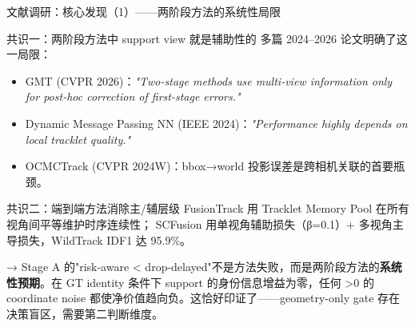 \documentclass[aspectratio=169,xcolor=dvipsnames]{beamer}
\begin{document}
\begin{frame}{文献调研：核心发现（1）——两阶段方法的系统性局限}
\scriptsize
\begin{block}{共识一：两阶段方法中 support view 就是辅助性的}
多篇 2024--2026 论文明确了这一局限：
\begin{itemize}\setlength\itemsep{0pt}
  \item GMT (CVPR 2026)：\textit{"Two-stage methods use multi-view information only for post-hoc correction of first-stage errors."}
  \item Dynamic Message Passing NN (IEEE 2024)：\textit{"Performance highly depends on local tracklet quality."}
  \item OCMCTrack (CVPR 2024W)：bbox→world 投影误差是跨相机关联的首要瓶颈。
\end{itemize}
\end{block}

\begin{block}{共识二：端到端方法消除主/辅层级}
FusionTrack 用 Tracklet Memory Pool 在所有视角间平等维护时序连续性；
SCFusion 用单视角辅助损失（β=0.1）+ 多视角主导损失，WildTrack IDF1 达 95.9\%。
\end{block}

\vspace{-1mm}
{\small → Stage A 的"risk-aware < drop-delayed"不是方法失败，而是两阶段方法的\textbf{系统性预期}。在 GT identity 条件下 support 的身份信息增益为零，任何 >0 的 coordinate noise 都使净价值趋向负。这恰好印证了——geometry-only gate 存在决策盲区，需要第二判断维度。}
\end{frame}
\end{document}
